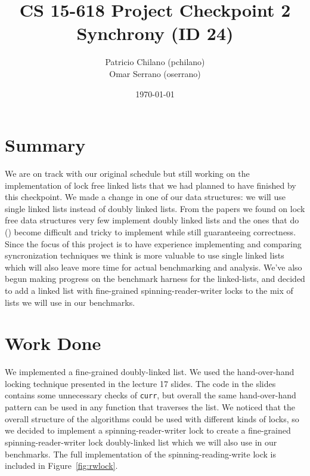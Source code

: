 \documentclass[11pt]{article}
\title{\vspace{-25pt}
\huge CS 15-618 Project Checkpoint 2 \\
\huge Synchrony (ID 24)
}
\author{
    Patricio Chilano (pchilano) \\
    Omar Serrano (oserrano)
}
\date{\today}
\begin{document}


\maketitle

\section*{Summary} We are on track with our original schedule but still working
on the implementation of lock free linked lists that we had planned to have
finished by this checkpoint.  We made a change in one of our data structures: we
will use single linked lists instead of doubly  linked lists. From the papers we
found on lock free data structures very  few implement doubly linked lists and
the ones that do (\cite{Sundell}) become difficult and tricky to implement while still
guaranteeing correctness. Since the focus of this project is to have experience
implementing  and comparing syncronization techniques we think is more valuable
to use single linked lists  which will also leave more time for actual
benchmarking and analysis. We've also begun making progress on the benchmark
harness for the linked-lists, and decided to add a linked list with fine-grained
spinning-reader-writer locks to the mix of lists we will use in our benchmarks.

\section*{Work Done}
We implemented a fine-grained doubly-linked list. We used the hand-over-hand
locking technique presented in the lecture 17 slides. The code in the slides
contains some unnecessary checks of {\tt curr}, but overall the same
hand-over-hand pattern can be used in any function that traverses the list. We
noticed that the overall structure of the algorithms could be used with
different kinds of locks, so we decided to implement a spinning-reader-writer
lock to create a fine-grained spinning-reader-writer lock doubly-linked list
which we will also use in our benchmarks. The full implementation of the
spinning-reading-write lock is included in Figure~\ref{fig:rwlock}.
\end{document}

